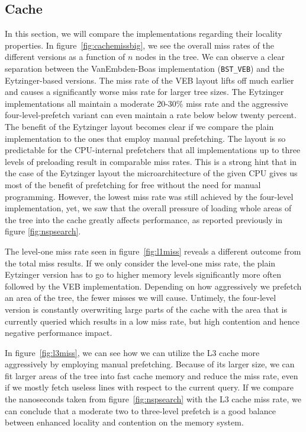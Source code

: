 \documentclass{article}
\begin{document}
\subsection{Cache}
\label{res:cache}
In this section, we will compare the implementations regarding their locality properties. In figure~\ref{fig:cachemissbig}, we see the overall miss rates of the different versions as a function of $n$ nodes in the tree. We can observe a clear separation between the VanEmbden-Boas implementation (\texttt{BST\_VEB}) and the Eytzinger-based versions. The miss rate of the VEB layout lifts off much earlier and causes a significantly worse miss rate for larger tree sizes. The Eytzinger implementations all maintain a moderate 20-30\% miss rate and the aggressive four-level-prefetch variant can even maintain a rate below below twenty percent. The benefit of the Eytzinger layout becomes clear if we compare the plain implementation to the ones that employ manual prefetching. The layout is so predictable for the CPU-internal prefetchers that all implementations up to three levels of preloading result in comparable miss rates. This is a strong hint that in the case of the Eytzinger layout the microarchitecture of the given CPU gives us most of the benefit of prefetching for free without the need for manual programming. However, the lowest miss rate was still achieved by the four-level implementation, yet, we saw that the overall pressure of loading whole areas of the tree into the cache greatly affects performance, as reported previously in figure \ref{fig:nspsearch}. 


The level-one miss rate seen in figure~\ref{fig:l1miss} reveals a different outcome from the total miss results. If we only consider the level-one miss rate, the plain Eytzinger version has to go to higher memory levels significantly more often followed by the VEB implementation. Depending on how aggressively we prefetch an area of the tree, the fewer misses we will cause. Untimely, the four-level version is constantly overwriting large parts of the cache with the area that is currently queried which results in a low miss rate, but high contention and hence negative performance impact.  


In figure~\ref{fig:l3miss}, we can see how we can utilize the L3 cache more aggressively by employing manual prefetching. Because of its larger size, we can fit larger areas of the tree into fast cache memory and reduce the miss rate, even if we mostly fetch useless lines with respect to the current query. If we compare the nanoseconds taken from figure~\ref{fig:nspsearch} with the L3 cache miss rate, we can conclude that a moderate two to three-level prefetch is a good balance between enhanced locality and contention on the memory system. 

\end{document}

